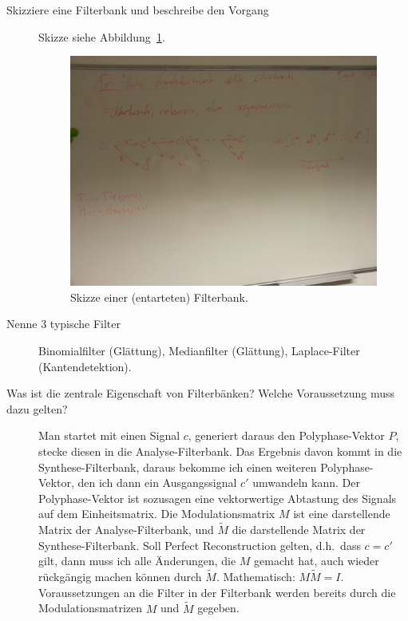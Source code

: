 \begin{description}
	\item[Skizziere eine Filterbank und beschreibe den Vorgang]
	Skizze siehe Abbildung~\ref{fig:Filterbank1}.
    \begin{figure}[ht]
    \centering
    \includegraphics[width=\linewidth]{Fotos/Filterbank1}
    \caption{Skizze einer (entarteten) Filterbank.}
    \label{fig:Filterbank1}
    \end{figure}
	\item[Nenne 3 typische Filter]
  	Binomialfilter (Glättung), Medianfilter (Glättung), Laplace-Filter (Kantendetektion).
	\item[Was ist die zentrale Eigenschaft von Filterbänken? Welche Voraussetzung muss dazu gelten?]
  	Man startet mit einen Signal $ c $, generiert daraus den Polyphase-Vektor $ P $, stecke diesen 
  	in die Analyse-Filterbank. Das Ergebnis davon kommt in die Synthese-Filterbank, daraus bekomme 
  	ich einen weiteren Polyphase-Vektor, den ich dann ein Ausgangssignal $ c' $ umwandeln kann.
  	Der Polyphase-Vektor ist sozusagen eine vektorwertige Abtastung des Signals auf dem 
  	Einheitsmatrix. Die Modulationsmatrix $ M $ ist eine darstellende Matrix der 
  	Analyse-Filterbank, und $ \widetilde{M} $ die darstellende Matrix der Synthese-Filterbank.
  	Soll Perfect Reconstruction gelten, d.h.\ dass $ c = c' $ gilt, dann muss ich alle Änderungen, 
  	die $ M $ gemacht hat, auch wieder rückgängig machen können durch $ \widetilde{M} $. 
  	Mathematisch: $ M \widetilde{M} = I $. Voraussetzungen an die Filter in der Filterbank werden 
  	bereits durch die Modulationsmatrizen $ M $ und $ \widetilde{M} $ gegeben.
  	

\end{description}
